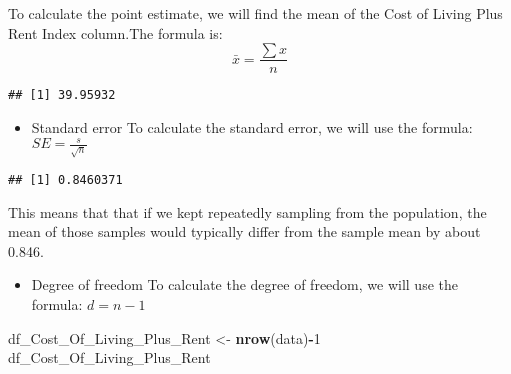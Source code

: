 \documentclass[
]{article}
\newenvironment{Shaded}{\begin{snugshade}}{\end{snugshade}}
\newcommand{\DecValTok}[1]{\textcolor[rgb]{0.00,0.00,0.81}{#1}}
\newcommand{\FunctionTok}[1]{\textcolor[rgb]{0.13,0.29,0.53}{\textbf{#1}}}
\newcommand{\NormalTok}[1]{#1}
\newcommand{\OtherTok}[1]{\textcolor[rgb]{0.56,0.35,0.01}{#1}}
\newcommand{\SpecialCharTok}[1]{\textcolor[rgb]{0.81,0.36,0.00}{\textbf{#1}}}
\providecommand{\tightlist}{%
  \setlength{\itemsep}{0pt}\setlength{\parskip}{0pt}}
\begin{document}
To calculate the point estimate, we will find the mean of the Cost of
Living Plus Rent Index column.The formula is:
\[\bar{x} = \frac{\sum x}{n}\]

\begin{Shaded}
\end{Shaded}

\begin{verbatim}
## [1] 39.95932
\end{verbatim}

\begin{itemize}
\tightlist
\item
  Standard error To calculate the standard error, we will use the
  formula: \(SE = \frac{s}{\sqrt{n}}\)
\end{itemize}

\begin{Shaded}
\end{Shaded}

\begin{verbatim}
## [1] 0.8460371
\end{verbatim}

This means that that if we kept repeatedly sampling from the population,
the mean of those samples would typically differ from the sample mean by
about 0.846.

\begin{itemize}
\tightlist
\item
  Degree of freedom To calculate the degree of freedom, we will use the
  formula: \(d = n-1\)
\end{itemize}

\begin{Shaded}
\begin{Highlighting}[]
\NormalTok{df\_Cost\_Of\_Living\_Plus\_Rent }\OtherTok{\textless{}{-}} \FunctionTok{nrow}\NormalTok{(data)}\SpecialCharTok{{-}}\DecValTok{1}
\NormalTok{df\_Cost\_Of\_Living\_Plus\_Rent}
\end{Highlighting}
\end{Shaded}
\end{document}
